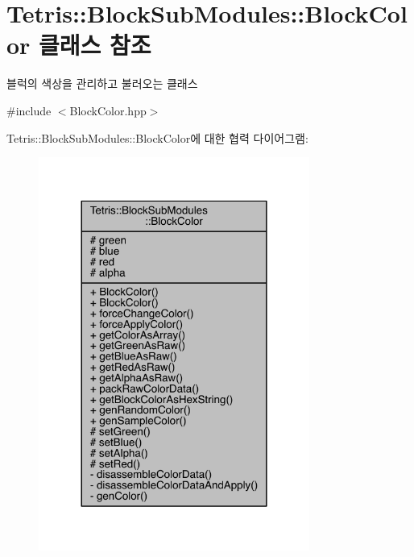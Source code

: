 \hypertarget{class_tetris_1_1_block_sub_modules_1_1_block_color}{}\section{Tetris\+:\+:Block\+Sub\+Modules\+:\+:Block\+Color 클래스 참조}
\label{class_tetris_1_1_block_sub_modules_1_1_block_color}


블럭의 색상을 관리하고 불러오는 클래스  




{\ttfamily \#include $<$Block\+Color.\+hpp$>$}



Tetris\+:\+:Block\+Sub\+Modules\+:\+:Block\+Color에 대한 협력 다이어그램\+:
\nopagebreak
\begin{figure}[H]
\begin{center}
\leavevmode
\includegraphics[width=252pt]{d8/d90/class_tetris_1_1_block_sub_modules_1_1_block_color__coll__graph}
\end{center}
\end{figure}
